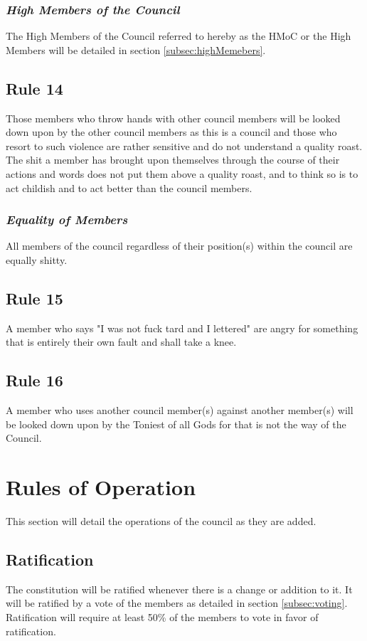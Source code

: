 \documentclass[]{article}
\begin{document}
\subsubsection{\textit{High Members of the Council}}
The High Members of the Council referred to hereby as the HMoC or the High Members will be detailed in section \ref{subsec:highMemebers}.

\subsection{Rule 14}
Those members who throw hands with other council members will be looked down upon by the other council members as this is a council and those who resort to such violence are rather sensitive and do not understand a quality roast. The shit a member has brought upon themselves through the course of their actions and words does not put them above a quality roast, and to think so is to act childish and to act better than the council members.
\subsubsection{\textit{Equality of Members}}
All members of the council regardless of their position(s) within the council are equally shitty. 

\subsection{Rule 15}
A member who says "I was not fuck tard and I lettered" are angry for something that is entirely their own fault and shall take a knee.

\subsection{Rule 16}
A member who uses another council member(s) against another member(s) will be looked down upon by the Toniest of all Gods for that is not the way of the Council.

\newpage
\section{Rules of Operation}
\label{sec:rulesOperation}
This section will detail the operations of the council as they are added.

\subsection{Ratification}
The constitution will be ratified whenever there is a change or addition to it. It will be ratified by a vote of the members as detailed in section \ref{subsec:voting}. Ratification will require at least 50\% of the members to vote in favor of ratification.
\end{document}
